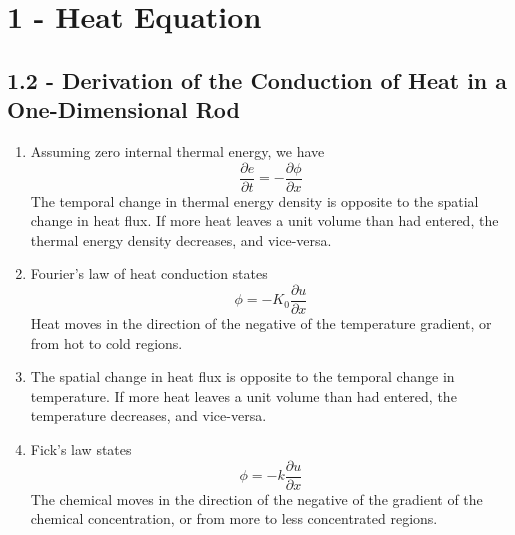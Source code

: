 \documentclass[a4paper]{article}
\begin{document}
\maketitle

\newpage
\tableofcontents

\newpage
\section{\textsf{1 - Heat Equation}}

\subsection{\textsf{1.2 - Derivation of the Conduction of Heat in a One-Dimensional Rod}}

\begin{enumerate}[label=(\alph*)]
	\item Assuming zero internal thermal energy, we have
	\[
		\frac{\partial e}{\partial t} = -\frac{\partial \phi}{\partial x} 
	\]
	The temporal change in thermal energy density is opposite to the spatial change in heat flux. If more heat leaves a unit volume than had entered, the thermal energy density decreases, and vice-versa.
	\item Fourier's law of heat conduction states
	\[
		\phi = -K_{0}\frac{\partial u}{\partial x} 
	\]
	Heat moves in the direction of the negative of the temperature gradient, or from hot to cold regions.
	\item The spatial change in heat flux is opposite to the temporal change in temperature. If more heat leaves a unit volume than had entered, the temperature decreases, and vice-versa.
	\item Fick's law states
	\[
		\phi = -k \frac{\partial u}{\partial x} 
	\]
	The chemical moves in the direction of the negative of the gradient of the chemical concentration, or from more to less concentrated regions.
\end{enumerate}
\end{document}
